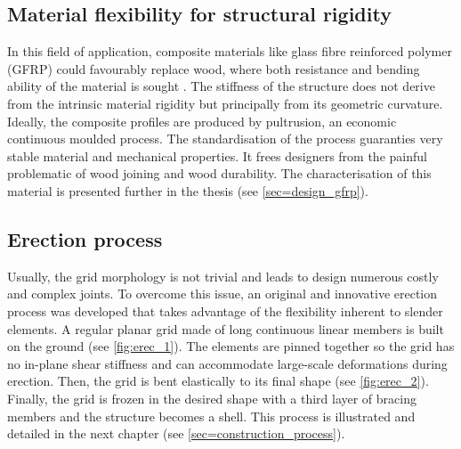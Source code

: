 
\subsection{Material flexibility for structural rigidity}\label{sec=def_flexibility}
In this field of application, composite materials like glass fibre reinforced polymer (GFRP) could favourably replace wood, where both resistance and bending ability of the material is sought \cite{Douthe2010a}. The stiffness of the structure does not derive from the intrinsic material rigidity but principally from its geometric curvature. Ideally, the composite profiles are produced by pultrusion, an economic continuous moulded process. The standardisation of the process guaranties very stable material and mechanical properties. It frees designers from the painful problematic of wood joining and wood durability. The characterisation of this material is presented further in the thesis (see \cref{sec=design_gfrp}).

\subsection{Erection process}\label{sec=def_erec}
Usually, the grid morphology is not trivial and leads to design numerous costly and complex joints. To overcome this issue, an original and innovative erection process was developed that takes advantage of the flexibility inherent to slender elements. A regular planar grid made of long continuous linear members is built on the ground (see \cref{fig:erec_1}). The elements are pinned together so the grid has no in-plane shear stiffness and can accommodate large-scale deformations during erection. Then, the grid is bent elastically to its final shape (see \cref{fig:erec_2}). Finally, the grid is frozen in the desired shape with a third layer of bracing members and the structure becomes a shell. This process is illustrated and detailed in the next chapter (see \cref{sec=construction_process}).


